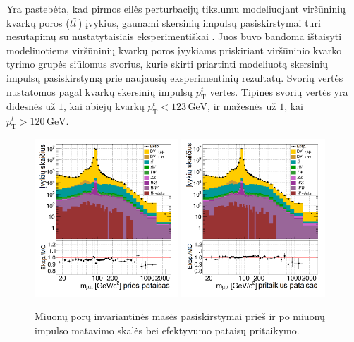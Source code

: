 \documentclass[a4paper, 12pt, oneside]{article}
\begin{document}
Yra pastebėta, kad pirmos eilės perturbacijų tikslumu modeliuojant viršūninių kvarkų poros ($t\bar{t}\,$)
įvykius, gaunami skersinių impulsų pasiskirstymai turi nesutapimų su nustatytaisiais eksperimentiškai \cite{ttbarPT}.
Juos buvo bandoma ištaisyti modeliuotiems viršūninių kvarkų poros įvykiams priskiriant viršūninio kvarko tyrimo grupės
siūlomus svorius, kurie skirti priartinti modeliuotą skersinių impulsų pasiskirstymą prie naujausių eksperimentinių rezultatų.
Svorių vertės nustatomos pagal kvarkų skersinių impulsų $p_{\mathrm{T}}^{t}$ vertes.
Tipinės svorių vertės yra didesnės už $1$, kai abiejų kvarkų $p_{\mathrm{T}}^{t}<123 \, \mathrm{GeV}$, ir mažesnės už $1$,
kai $p_{\mathrm{T}}^{t}>120 \, \mathrm{GeV}$.

\begin{figure}[H]
	\includegraphics[width=0.48\textwidth]{Kursinis3/mumu_mass_before.png}
	\includegraphics[width=0.48\textwidth]{Kursinis3/mumu_mass_afterSF.png}
	\caption{\label{fig:invMba} Miuonų porų invariantinės masės pasiskirstymai prieš ir po miuonų impulso matavimo skalės
	bei efektyvumo pataisų pritaikymo.}
\end{figure}
\end{document}
